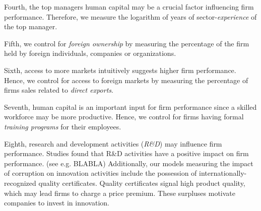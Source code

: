 Fourth, the top managers human capital may be a crucial factor influencing firm performance. Therefore, we measure the logarithm of years of sector-\textit{experience} of the top manager.

Fifth, we control for \textit{foreign ownership} by measuring the percentage of the firm held by foreign individuals, companies or organizations. 

Sixth, access to more markets intuitively suggests higher firm performance. Hence, we control for access to foreign markets by measuring the percentage of firms sales related to \textit{direct exports}. 

Seventh, human capital is an important input for firm performance since a skilled workforce may be more productive. Hence, we control for firms having formal \textit{training programs} for their employees.

Eighth, research and development activities (\textit{R\&D}) may influence firm performance. Studies found that R\&D activities have a positive impact on firm performance. (see e.g. BLABLA) Additionally, our models measuring the impact of corruption on innovation activities include the possession of internationally-recognized quality certificates. Quality certificates signal high product quality, which may lead firms to charge a price premium. These surpluses motivate companies to invest in innovation. \citep[p. 218]{paunov2016corruption}


